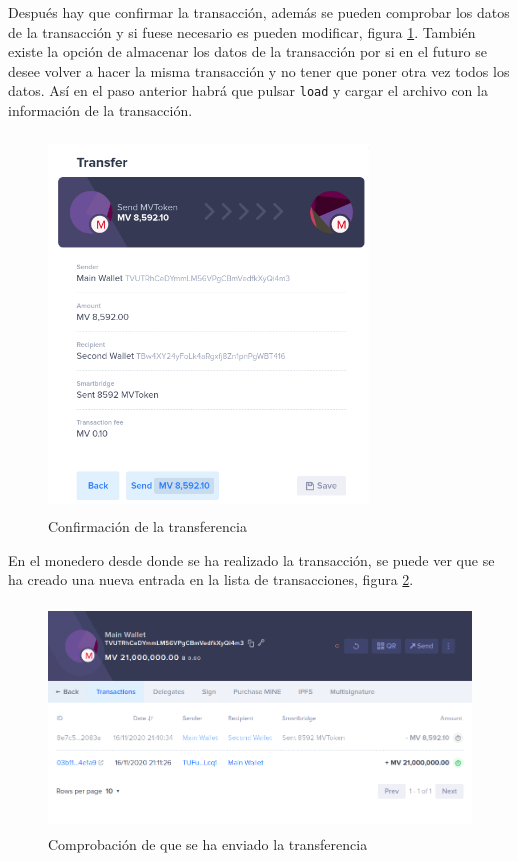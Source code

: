 Después hay que confirmar la transacción, además se pueden comprobar los datos de la transacción y si fuese necesario es pueden modificar, figura \ref{fig:wallet-19}. También existe la opción de almacenar los datos de la transacción por si en el futuro se desee volver a hacer la misma transacción y no tener que poner otra vez todos los datos. Así en el paso anterior habrá que pulsar \texttt{load} y cargar el archivo con la información de la transacción.

\begin{figure}[H]
	\centering
	\includegraphics[width=8.5cm,height=10cm]{figuras/wallet_19.png}
	\caption{Confirmación de la transferencia}
	\label{fig:wallet-19}
\end{figure}

En el monedero desde donde se ha realizado la transacción, se puede ver que se ha creado una nueva entrada en la lista de transacciones, figura \ref{fig:wallet-20}.

\begin{figure}[H]
	\centering
	\includegraphics[width=12cm,height=6cm]{figuras/wallet_20.png}
	\caption{Comprobación de que se ha enviado la transferencia}
	\label{fig:wallet-20}
\end{figure}



